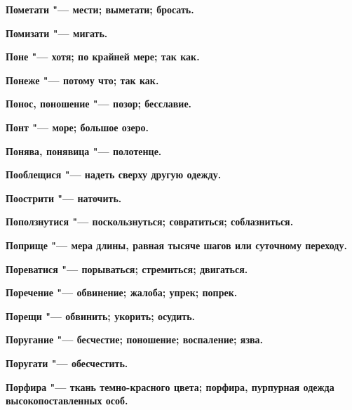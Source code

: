 \bfseries Пометати \normalfont{} "--- мести; выметати; бросать. 




\bfseries Помизати \normalfont{} "--- мигать. 




\bfseries Поне \normalfont{} "--- хотя; по крайней мере; так как. 




\bfseries Понеже \normalfont{} "--- потому что; так как. 




\bfseries Понос, поношение \normalfont{} "--- позор; бесславие. 




\bfseries Понт \normalfont{} "--- море; большое озеро. 




\bfseries Понява, понявица \normalfont{} "--- полотенце. 




\bfseries Пооблещися \normalfont{} "--- надеть сверху другую одежду. 




\bfseries Поострити \normalfont{} "--- наточить. 




\bfseries Поползнутися \normalfont{} "--- поскользнуться; совратиться; соблазниться. 




\bfseries Поприще \normalfont{} "--- мера длины, равная тысяче шагов или суточному переходу. 




\bfseries Пореватися \normalfont{} "--- порываться; стремиться; двигаться. 




\bfseries Поречение \normalfont{} "--- обвинение; жалоба; упрек; попрек. 




\bfseries Порещи \normalfont{} "--- обвинить; укорить; осудить. 




\bfseries Поругание \normalfont{} "--- бесчестие; поношение; воспаление; язва. 




\bfseries Поругати \normalfont{} "--- обесчестить. 




\bfseries Порфира \normalfont{} "--- ткань темно-красного цвета; порфира, пурпурная одежда высокопоставленных особ. 





